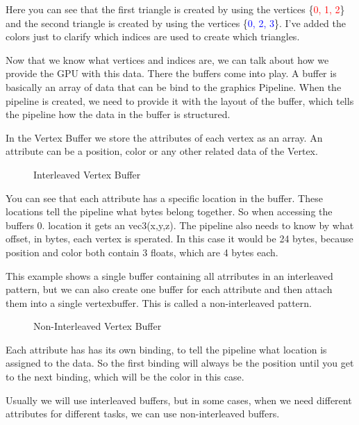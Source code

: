 \documentclass[12pt]{report} \usepackage{preamble}
\begin{document}
Here you can see that the first triangle is created by using the vertices
\{\textcolor{red}{0, 1, 2}\} and the second triangle is created by using
the vertices \{\textcolor{blue}{0, 2, 3}\}. I've added the colors just
to clarify which indices are used to create which triangles.

Now that we know what vertices and indices are, we can talk about how we
provide the GPU with this data. There the buffers come into play. A buffer
is basically an array of data that can be bind to the graphics Pipeline.
When the pipeline is created, we need to provide it with the layout of the
buffer, which tells the pipeline how the data in the buffer is structured.
\cite{vulkan-tutorial-vertex-buffer}

In the Vertex Buffer we store the attributes of each vertex as an
array. An attribute can be a position, color or any other related data
of the Vertex. \cite{vulkan-tutorial-vertex-buffer}

\begin{figure}[hbtp]
	\centering 
	\caption{Interleaved Vertex Buffer}
\end{figure} \FloatBarrier

You can see that each attribute has a specific location in the buffer.
These locations tell the pipeline what bytes belong together. So when
accessing the buffers 0. location it gets an vec3(x,y,z).  The pipeline
also needs to know by what offset, in bytes, each vertex is sperated.
In this case it would be 24 bytes, because position and color both
contain 3 floats, which are 4 bytes each. \cite{vulkan-tutorial-vertex-buffer}

This example shows a single buffer containing all atrributes in
an interleaved pattern, but we can also create one buffer for each
attribute and then attach them into a single vertexbuffer. This is called
a non-interleaved pattern.

\begin{figure}[hbtp]
	
	\caption{Non-Interleaved Vertex Buffer}
\end{figure} \FloatBarrier

Each attribute has has its own binding, to tell the pipeline what location
is assigned to the data. So the first binding will always be the position
until you get to the next binding, which will be the color in this case.
\cite{vulkan-tutorial-vertex-buffer}

Usually we will use interleaved buffers, but in some cases, when we need
different attributes for different tasks, we can use non-interleaved
buffers.
\end{document}
